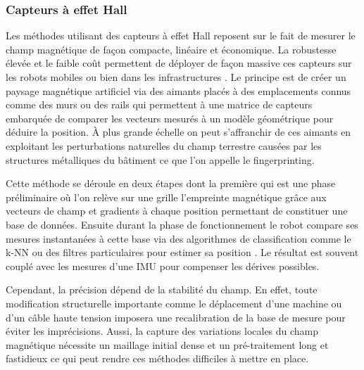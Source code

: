\documentclass[11pt, a4paper]{article}
\begin{document}
\subsubsection{Capteurs à effet Hall}

Les méthodes utilisant des capteurs à effet Hall reposent sur le fait de mesurer le champ magnétique de façon compacte, linéaire et économique. La robustesse élevée et le faible coût permettent de déployer de façon massive ces capteurs sur les robots mobiles ou bien dans les infrastructures \cite{ramsden2006hall}. Le principe est de créer un paysage magnétique artificiel via des aimants placés à des emplacements connus comme des murs ou des rails qui permettent à une matrice de capteurs embarquée de comparer les vecteurs mesurés à un modèle géométrique pour déduire la position. À plus grande échelle on peut s’affranchir de ces aimants en exploitant les perturbations naturelles du champ terrestre causées par les structures métalliques du bâtiment ce que l’on appelle le fingerprinting.

Cette méthode se déroule en deux étapes dont la première qui est une phase préliminaire où l'on relève sur une grille l’empreinte magnétique grâce aux vecteurs de champ et gradients à chaque position permettant de constituer une base de données. Ensuite durant la phase de fonctionnement le robot compare ses mesures instantanées à cette base via des algorithmes de classification comme le k-NN ou des filtres particulaires pour estimer sa position \cite{retscherIndoorNavigationUser2022}. Le résultat est souvent couplé avec les mesures d’une IMU pour compenser les dérives possibles.

Cependant, la précision dépend de la stabilité du champ. En effet, toute modification structurelle importante comme le déplacement d’une machine ou d’un câble haute tension imposera une recalibration de la base de mesure pour éviter les imprécisions.  Aussi, la capture des variations locales du champ magnétique nécessite un maillage initial dense et un pré-traitement long et fastidieux ce qui peut rendre ces méthodes difficiles à mettre en place.

\newpage


\end{document}
